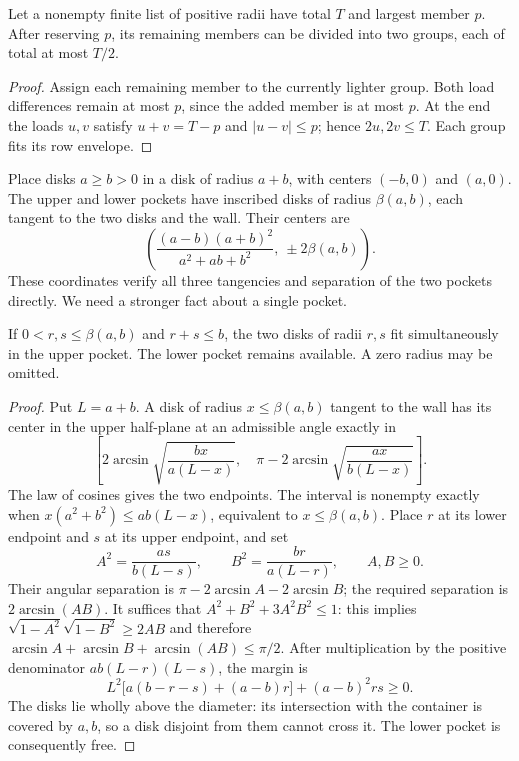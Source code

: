 \begin{lemma}\label{gt:split}
Let a nonempty finite list of positive radii have total $T$ and largest
member $p$. After reserving $p$, its remaining members can be divided
into two groups, each of total at most $T/2$.
\end{lemma}
\begin{proof}
Assign each remaining member to the currently lighter group. Both load
differences remain at most $p$, since the added member is at most $p$.
At the end the loads $u,v$ satisfy $u+v=T-p$ and $|u-v|\le p$;
hence $2u,2v\le T$. Each group fits its row envelope.
\end{proof}

Place disks $a\ge b>0$ in a disk of radius $a+b$, with centers
$(-b,0)$ and $(a,0)$. The upper and lower pockets have inscribed
disks of radius $\beta(a,b)$, each tangent to the two disks and the wall.
Their centers are
\[
 \left(\frac{(a-b)(a+b)^2}{a^2+ab+b^2},\ \pm2\beta(a,b)\right).
\]
These coordinates verify all three tangencies and separation of the two
pockets directly. We need a stronger fact about a single pocket.

\begin{lemma}\label{gt:arbelos}
If $0<r,s\le\beta(a,b)$ and $r+s\le b$, the two disks of radii
$r,s$ fit simultaneously in the upper pocket. The lower pocket remains
available. A zero radius may be omitted.
\end{lemma}
\begin{proof}
Put $L=a+b$. A disk of radius $x\le\beta(a,b)$ tangent to the wall
has its center in the upper half-plane at an admissible angle exactly in
\[
 \left[2\arcsin\sqrt{\frac{bx}{a(L-x)}},\quad
 \pi-2\arcsin\sqrt{\frac{ax}{b(L-x)}}\right].
\]
The law of cosines gives the two endpoints. The interval is nonempty
exactly when $x(a^2+b^2)\le ab(L-x)$, equivalent to $x\le\beta(a,b)$.
Place $r$ at its lower endpoint and $s$ at its upper endpoint, and set
\[
 A^2=\frac{as}{b(L-s)},\qquad B^2=\frac{br}{a(L-r)},\qquad A,B\ge0.
\]
Their angular separation is $\pi-2\arcsin A-2\arcsin B$; the
required separation is $2\arcsin(AB)$. It suffices that
$A^2+B^2+3A^2B^2\le1$: this implies
$\sqrt{1-A^2}\sqrt{1-B^2}\ge2AB$ and therefore
$\arcsin A+\arcsin B+\arcsin(AB)\le\pi/2$.
After multiplication by the positive denominator $ab(L-r)(L-s)$,
the margin is
\[
 L^2\bigl[a(b-r-s)+(a-b)r\bigr]+(a-b)^2rs\ge0.
\]
The disks lie wholly above the diameter: its intersection with the
container is covered by $a,b$, so a disk disjoint from them cannot
cross it. The lower pocket is consequently free.
\end{proof}

